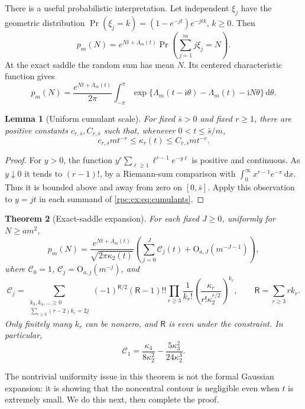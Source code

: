 \documentclass[11pt]{article}
\newtheorem{theorem}{Theorem}[section]
\newtheorem{lemma}[theorem]{Lemma}
\theoremstyle{definition}
\theoremstyle{remark}
\newcommand{\ii}{\mathrm i}
\newcommand{\dd}{\,\mathrm d}
\numberwithin{equation}{section}
\begin{document}
There is a useful probabilistic interpretation. Let independent $\xi_j$
have the geometric distribution
$\Pr(\xi_j=k)=(1-e^{-jt})e^{-jtk}$, $k\ge0$. Then
\begin{equation}
 p_m(N)=e^{Nt+\Lambda_m(t)}\Pr\!\left(\sum_{j=1}^m j\xi_j=N\right).
\end{equation}
At the exact saddle the random sum has mean $N$. Its centered
characteristic function gives
\begin{equation}\label{rpc:cx:eq:cauchy}
 p_m(N)=\frac{e^{Nt+\Lambda_m(t)}}{2\pi}
 \int_{-\pi}^{\pi}
   \exp\{\Lambda_m(t-\ii\theta)-\Lambda_m(t)-\ii N\theta\}\dd\theta.
\end{equation}

\begin{lemma}[Uniform cumulant scale]\label{rpc:cx:lem:cumulants}
For fixed $\bar s>0$ and fixed $r\ge1$, there are positive constants
$c_{r,\bar s},C_{r,\bar s}$ such that, whenever $0<t\le \bar s/m$,
\begin{equation}\label{rpc:cx:eq:cumulantscale}
 c_{r,\bar s}mt^{-r}\le\kappa_r(t)\le C_{r,\bar s}mt^{-r}.
\end{equation}
\end{lemma}
\begin{proof}
For $y>0$, the function
$y^r\sum_{\ell\ge1}\ell^{r-1}e^{-y\ell}$ is positive and continuous.
As $y\downarrow0$ it tends to $(r-1)!$, by a Riemann-sum comparison with
$\int_0^\infty x^{r-1}e^{-x}\dd x$. Thus it is bounded above and
away from zero on $[0,\bar s]$. Apply this observation to $y=jt$ in each
summand of \eqref{rpc:cx:eq:cumulants}.
\end{proof}

\begin{theorem}[Exact-saddle expansion]\label{rpc:cx:thm:finite}
For each fixed $J\ge0$, uniformly for $N\ge am^2$,
\begin{equation}\label{rpc:cx:eq:finiteexp}
 p_m(N)=\frac{e^{Nt+\Lambda_m(t)}}{\sqrt{2\pi\kappa_2(t)}}
 \left(\sum_{j=0}^J \mathcal C_j(t)+\mathrm O_{a,J}(m^{-J-1})\right),
\end{equation}
where $\mathcal C_0=1$, $\mathcal C_j=\mathrm O_{a,j}(m^{-j})$, and
\begin{equation}\label{rpc:cx:eq:Edgeworth}
 \mathcal C_j=\sum_{\substack{k_3,k_4,\ldots\ge0\\
               \sum_{r\ge3}(r-2)k_r=2j}}
 (-1)^{\mathsf R/2}(\mathsf R-1)!!
 \prod_{r\ge3}\frac1{k_r!}
 \left(\frac{\kappa_r}{r!\kappa_2^{r/2}}\right)^{k_r},
 \qquad \mathsf R=\sum_{r\ge3}rk_r.
\end{equation}
Only finitely many $k_r$ can be nonzero, and $\mathsf R$ is even under the
constraint. In particular,
\begin{equation}\label{rpc:cx:eq:C1}
 \mathcal C_1=\frac{\kappa_4}{8\kappa_2^2}
          -\frac{5\kappa_3^2}{24\kappa_2^3}.
\end{equation}
\end{theorem}
The nontrivial uniformity issue in this theorem is not the formal
Gaussian expansion: it is showing that the noncentral contour is
negligible even when $t$ is extremely small. We do this next, then
complete the proof.
\end{document}
